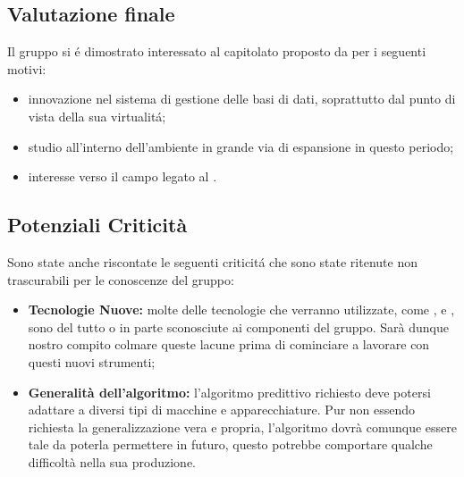 \subsection{Valutazione finale}
Il gruppo si \'e dimostrato interessato al capitolato proposto da \Proponente{} per i seguenti motivi:
\begin{itemize}
	\item innovazione nel sistema di gestione delle basi di dati, soprattutto dal punto di vista della sua virtualit\'a;
	\item studio all'interno dell'ambiente  in grande via di espansione in questo periodo;
	\item interesse verso il campo legato al .
\end{itemize}

\subsection{Potenziali Criticità}

Sono state anche riscontate le seguenti criticit\'a che sono state ritenute non trascurabili per le conoscenze del gruppo:

\begin{itemize}
	\item \textbf{Tecnologie Nuove:} molte delle tecnologie che verranno utilizzate, come ,  e , sono del tutto o in parte sconosciute ai componenti del gruppo. Sarà dunque nostro compito colmare queste lacune prima di cominciare a lavorare con questi nuovi strumenti;
\end{itemize}

\begin{itemize}
	\item \textbf{Generalità dell'algoritmo:} l'algoritmo predittivo richiesto deve potersi adattare a diversi tipi di macchine e apparecchiature. Pur non essendo richiesta la generalizzazione vera e propria, l'algoritmo dovrà comunque essere tale da poterla permettere in futuro, questo potrebbe comportare qualche difficoltà nella sua produzione.
\end{itemize}